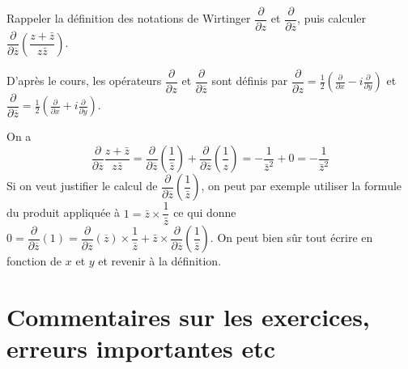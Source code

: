 \begin{exo}
Rappeler la définition des notations de Wirtinger $\dfrac{\partial}{\partial z}$ et $\dfrac{\partial}{\partial \overline z}$, puis calculer $\dfrac{\partial}{\partial \overline z}\left(\dfrac{z+\bar z}{z\bar z}\right)$.
\begin{sol}
D'après le cours, les opérateurs $\dfrac{\partial}{\partial z}$ et $\dfrac{\partial}{\partial \overline z}$ sont définis par 
$\dfrac{\partial}{\partial z} = \frac12 \left(\frac{\partial}{\partial x}-i\frac{\partial}{\partial y}\right)$ et$\dfrac{\partial}{\partial \overline z} = \frac12 \left(\frac{\partial}{\partial x}+i\frac{\partial}{\partial y}\right)$.

On a  
\[ 
\dfrac{\partial}{\partial \overline z}\dfrac{z+\bar z}{z\bar z}
=\dfrac{\partial}{\partial \overline z}\left(\dfrac{1}{\bar z}\right)+\dfrac{\partial}{\partial \overline z}\left(\dfrac{1}{z}\right)
= -\dfrac{1}{\bar z^2}+0 
=-\dfrac{1}{\bar z^2} \]
Si on veut justifier le calcul de $\dfrac{\partial}{\partial \overline z}\left(\dfrac{1}{\bar z}\right)$, on peut par exemple utiliser la formule du produit appliquée à $1=\bar z \times \dfrac{1}{\bar z}$ ce qui donne $0 = \dfrac{\partial}{\partial \overline z} (1) = \dfrac{\partial}{\partial \overline z} (\overline z) \times \dfrac{1}{\bar z} + \bar z \times \dfrac{\partial}{\partial \overline z} \left(\dfrac{1}{\bar z}\right)$. On peut bien sûr tout écrire en fonction de $x$ et $y$ et revenir à la définition.
\end{sol}
\end{exo}




\newpage
\section*{Commentaires sur les exercices, erreurs importantes etc}



